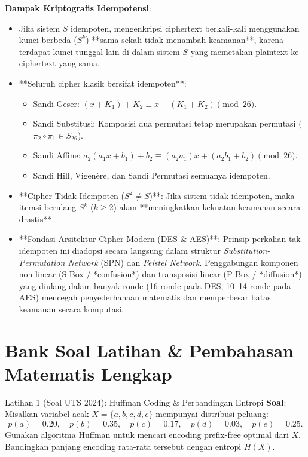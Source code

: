 \documentclass[11pt,a4paper]{article}
\begin{document}
\noindent\textbf{Dampak Kriptografis Idempotensi}:
\begin{itemize}[leftmargin=*]
    \item Jika sistem $S$ idempoten, mengenkripsi ciphertext berkali-kali menggunakan kunci berbeda ($S^k$) **sama sekali tidak menambah keamanan**, karena terdapat kunci tunggal lain di dalam sistem $S$ yang memetakan plaintext ke ciphertext yang sama.
    \item **Seluruh cipher klasik bersifat idempoten**:
    \begin{itemize}
        \item Sandi Geser: $(x + K_1) + K_2 \equiv x + (K_1 + K_2) \pmod{26}$.
        \item Sandi Substitusi: Komposisi dua permutasi tetap merupakan permutasi ($\pi_2 \circ \pi_1 \in S_{26}$).
        \item Sandi Affine: $a_2(a_1 x + b_1) + b_2 \equiv (a_2 a_1)x + (a_2 b_1 + b_2) \pmod{26}$.
        \item Sandi Hill, Vigen\`ere, dan Sandi Permutasi semuanya idempoten.
    \end{itemize}
    \item **Cipher Tidak Idempoten ($S^2 \neq S$)**:
    Jika sistem tidak idempoten, maka iterasi berulang $S^k$ ($k \ge 2$) akan **meningkatkan kekuatan keamanan secara drastis**.
    \item **Fondasi Arsitektur Cipher Modern (DES \& AES)**:
    Prinsip perkalian tak-idempoten ini diadopsi secara langsung dalam struktur \textit{Substitution-Permutation Network} (SPN) dan \textit{Feistel Network}. Penggabungan komponen non-linear (S-Box / *confusion*) dan transposisi linear (P-Box / *diffusion*) yang diulang dalam banyak ronde (16 ronde pada DES, 10--14 ronde pada AES) mencegah penyederhanaan matematis dan memperbesar batas keamanan secara komputasi.
\end{itemize}

\section{Bank Soal Latihan \& Pembahasan Matematis Lengkap}

\begin{exercisebox}{Latihan 1 (Soal UTS 2024): Huffman Coding \& Perbandingan Entropi}
\textbf{Soal}:
Misalkan variabel acak $X = \{a, b, c, d, e\}$ mempunyai distribusi peluang:
\[
p(a) = 0.20, \quad p(b) = 0.35, \quad p(c) = 0.17, \quad p(d) = 0.03, \quad p(e) = 0.25.
\]
Gunakan algoritma Huffman untuk mencari encoding prefix-free optimal dari $X$. Bandingkan panjang encoding rata-rata tersebut dengan entropi $H(X)$.
\end{exercisebox}
\end{document}
